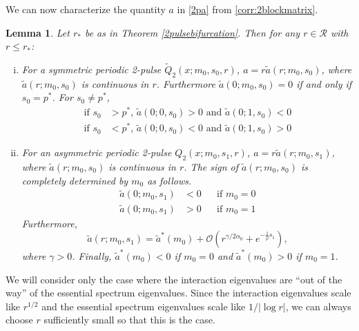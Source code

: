\documentclass[11pt,reqno]{amsart}
\theoremstyle{plain}
\newtheorem{lemma}[theorem]{Lemma}
\theoremstyle{definition}
\theoremstyle{remark}
\begin{document}
We can now characterize the quantity $a$ in \cref{2pa} from \cref{corr:2blockmatrix}.

\begin{lemma}\label{lemma:chara}
Let $r_*$ be as in Theorem \ref{2pulsebifurcation}. Then for any $r \in \mathcal{R}$ with $r \leq r_*$:
\begin{enumerate}[(i)]
	\item For a symmetric periodic 2-pulse $\tilde{Q}_2(x; m_0, s_0, r)$, $a = r \tilde{a}(r; m_0, s_0)$, where $\tilde{a}(r; m_0, s_0)$ is continuous in $r$. Furthermore $\tilde{a}(0; m_0, s_0) = 0$ if and only if $s_0 = p^*$. For $s_0 \neq p^*$,
	\begin{equation}
	\begin{aligned}
	\text{if }s_0 &> p^*, \, \tilde{a}(0; 0, s_0) > 0 \text{ and } \tilde{a}(0; 1, s_0) < 0 \\
	\text{if }s_0 &< p^*, \, \tilde{a}(0; 0, s_0) < 0 \text{ and } \tilde{a}(0; 1, s_0) > 0 
	\end{aligned}
	\end{equation}

	\item For an asymmetric periodic 2-pulse $Q_2(x; m_0, s_1, r)$, $a = r \tilde{a}(r; m_0, s_1)$, where $\tilde{a}(r; m_0, s_0)$ is continuous in $r$. The sign of $\tilde{a}(r; m_0, s_0)$ is completely determined by $m_0$ as follows.
	\begin{equation} 
	\begin{aligned}
	\tilde{a}(0; m_0, s_1) &< 0 && \text{if }m_0 = 0 \\
	\tilde{a}(0; m_0, s_1) &> 0 && \text{if }m_0 = 1
	\end{aligned}
	\end{equation}
	Furthermore,
	\begin{equation}\label{tildeas1limit}
	\tilde{a}(r; m_0, s_1) = \tilde{a}^*(m_0) + \mathcal{O}\left(r^{\gamma/2\alpha_0} + e^{-\frac{1}{\rho}s_1} \right),
	\end{equation}
	where $\gamma > 0$. Finally, $\tilde{a}^*(m_0) < 0$ if $m_0 = 0$ and $\tilde{a}^*(m_0) > 0$ if $m_0 = 1$.
\end{enumerate}	
\end{lemma}

We will consider only the case where the interaction eigenvalues are ``out of the way'' of the essential spectrum eigenvalues. Since the interaction eigenvalues scale like $r^{1/2}$ and the essential spectrum eigenvalues scale like $1/|\log r|$, we can always choose $r$ sufficiently small so that this is the case. 
\end{document}
